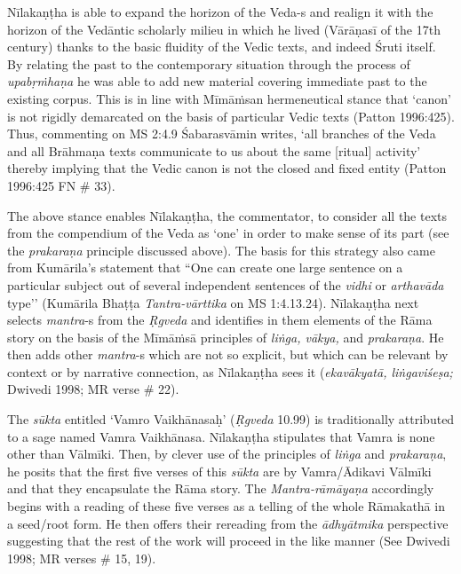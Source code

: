 \vskip 2pt

Nīlakaṇṭha is able to expand the horizon of the Veda-s and realign it with the horizon of the Vedāntic scholarly milieu in which he lived (Vārāṇasī of the 17th century) thanks to the basic fluidity of the Vedic texts, and indeed Śruti itself. By relating the past to the contemporary situation through the process of \textit{upabṛṁhaṇa} he was able to add new material covering immediate past to the existing corpus. This is in line with Mīmāṁsan hermeneutical stance that ‘canon’ is not rigidly demarcated on the basis of particular Vedic texts (Patton 1996:425). Thus, commenting on MS 2:4.9 Śabarasvāmin writes, ‘all branches of the Veda and all Brāhmaṇa texts communicate to us about the same [ritual] activity’ thereby implying that the Vedic canon is not the closed and fixed entity (Patton 1996:425 FN \# 33).

\vskip 2pt

The above stance enables Nīlakaṇṭha, the commentator, to consider all the texts from the compendium of the Veda as ‘one’ in order to make sense of its part (see the \textit{prakaraṇa} principle discussed above). The basis for this strategy also came from Kumārila’s statement that “One can create one large sentence on a particular subject out of several independent sentences of the \textit{vidhi} or \textit{arthavāda} type’’ (Kumārila Bhaṭṭa \textit{Tantra-vārttika} on MS 1:4.13.24). Nīlakaṇṭha next selects \hbox{\textit{mantra}-s} from the \textit{Ṛgveda} and identifies in them elements of the Rāma story on the basis of the Mīmāṁsā principles of \textit{liṅga, vākya,} and \textit{prakaraṇa}. He then adds other \textit{mantra}-s which are not so explicit, but which can be relevant by context or by narrative connection, as Nīlakaṇṭha sees it (\textit{ekavākyatā, liṅgaviśeṣa;} Dwivedi 1998; MR verse \# 22).

\vskip 2pt

The \textit{sūkta} entitled ‘Vamro Vaikhānasaḥ’ (\textit{Ṛgveda} 10.99) is traditionally attributed to a sage named Vamra Vaikhānasa. Nīlakaṇṭha stipulates that Vamra is none other than Vālmīki. Then, by clever use of the principles of \textit{liṅga} and \textit{prakaraṇa}, he posits that the first five verses of this \textit{sūkta} are by Vamra/Ādikavi Vālmīki and that they encapsulate the Rāma story. The \textit{Mantra-rāmāyaṇa} accordingly begins with a reading of these five verses as a telling of the whole Rāmakathā in a seed/root form. He then offers their rereading from the \textit{ādhyātmika} perspective suggesting that the rest of the work will proceed in the like manner (See Dwivedi 1998; MR verses \# 15, 19).

